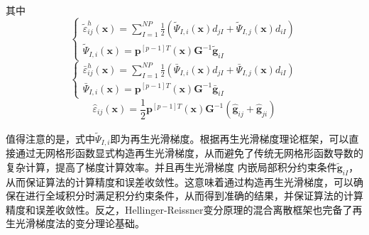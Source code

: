 其中
\begin{equation}
\begin{cases}\label{case1}
    \tilde{\varepsilon}^h_{ij}(\pmb{x})=\displaystyle\sum_{I=1}^{N\!P}\frac{1}{2}(\tilde{\Psi}_{I,i}(\pmb{x})d_{jI}+\tilde{\Psi}_{I,j}(\pmb{x})d_{iI})\\
    \tilde{\Psi}_{I,i}(\pmb{x})=\pmb{p}^{[p-1]T}(\pmb{x})\pmb{G}^{-1}\tilde{\pmb g}_{iI}
\end{cases}
\end{equation}
\begin{equation}
\begin{cases}\label{case2}
    \bar{\varepsilon}^h_{ij}(\pmb{x})=\displaystyle\sum_{I=1}^{N\!P}\frac{1}{2}(\bar{\Psi}_{I,i}(\pmb{x})d_{jI}+\bar{\Psi}_{I,j}(\pmb{x})d_{iI})\\
    \bar{\Psi}_{I,i}(\pmb{x})=\pmb{p}^{[p-1]T}(\pmb{x})\pmb{G}^{-1}\bar{\pmb g}_{iI}
\end{cases}
\end{equation}
\begin{equation}\label{case3}
    \hat{\varepsilon}_{ij}(\pmb{x})=\frac{1}{2}\pmb{p}^{[p-1]T}(\pmb{x})\pmb{G}^{-1}(\hat{\pmb g}_{ij}+\hat{\pmb g}_{ji})
\end{equation} \par
值得注意的是，式中$\tilde{\Psi}_{I,i}$即为再生光滑梯度\textsuperscript{\cite{wang2019}}。根据再生光滑梯度理论框架，可以直接通过无网格形函数显式构造再生光滑梯度，从而避免了传统无网格形函数导数的复杂计算，提高了梯度计算效率。并且再生光滑梯度
内嵌局部积分约束条件$\tilde{\pmb g}_{iI}$，从而保证算法的计算精度和误差收敛性。这意味着通过构造再生光滑梯度，可以确保在进行全域积分时满足积分约束条件，从而得到准确的结果，并保证算法的计算精度和误差收敛性。反之，Hellinger-Reissner变分原理的混合离散框架也完备了再生光滑梯度法的变分理论基础。\par
